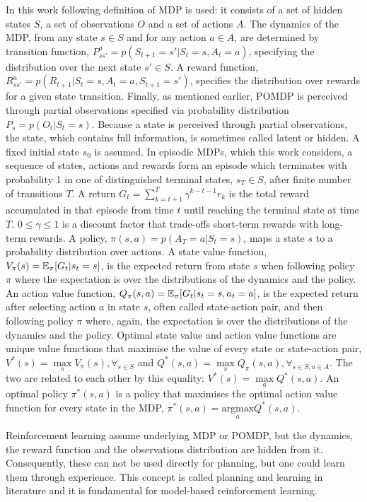 In this work following definition of MDP is used: it consists of a set of hidden states $S$, a set of observations $O$ and a set of actions $A$. The dynamics of the MDP, from any state $s \in S$ and for any action $a \in A$, are determined by transition function, $P^a_{ss'} = p(S_{t+1} = s' | S_t = s, A_t = a)$, specifying the distribution over the next state $s' \in S$. A reward function, $R^a_{ss'} = p(R_{t+1} | S_t = s, A_t = a, S_{t+1} = s')$, specifies the distribution over rewards for a given state transition. Finally, as mentioned earlier, POMDP is perceived through partial observations specified via probability distribution $P_s = p(O_t | S_t = s)$. Because a state is perceived through partial observations, the state, which contains full information, is sometimes called latent or hidden.
A fixed initial state $s_0$ is assumed. In episodic MDPs, which this work considers, a sequence of states, actions and rewards form an episode which terminates with probability 1 in one of distinguished terminal states, $s_T \in S$, after finite number of transitions $T$. A return $G_t = \sum^T_{k=t+1}\gamma^{k-t-1}r_k$ is the total reward accumulated in that episode from time $t$ until reaching the terminal state at time $T$. $0 \leqslant \gamma \leqslant 1$ is a discount factor that trade-offs short-term rewards with long-term rewards.
A policy, $\pi(s, a) = p(A_T = a | S_t = s)$, maps a state $s$ to a probability distribution over actions.
A state value function, $V_\pi(s) = \operatorname{\mathbb{E}}_\pi[G_t | s_t = s]$, is the expected return from state $s$ when following policy $\pi$ where the expectation is over the distributions of the dynamics and the policy.
An action value function, $Q_\pi(s, a) = \operatorname{\mathbb{E}}_\pi[G_t | s_t = s, a_t = a]$, is the expected return after selecting action $a$ in state $s$, often called state-action pair, and then following policy $\pi$ where, again, the expectation is over the distributions of the dynamics and the policy.
Optimal state value and action value functions are unique value functions that maximise the value of every state or state-action pair, $V^*(s) = \underset{\pi}{\max}V_\pi(s), \forall_{s \in S}$ and $Q^*(s, a) = \underset{\pi}{\max}Q_\pi(s, a), \forall_{s \in S, a \in A}$. The two are related to each other by this equality: $V^*(s) = \underset{a}{\max}Q^*(s, a)$.
An optimal policy $\pi^*(s, a)$ is a policy that maximises the optimal action value function for every state in the MDP, $\pi^*(s, a) = \underset{a}{\mathrm{argmax}}Q^*(s, a)$.

Reinforcement learning assume underlying MDP or POMDP, but the dynamics, the reward function and the observations distribution are hidden from it. Consequently, these can not be used directly for planning, but one could learn them through experience. This concept is called planning and learning in literature \cite{Book.RLAI} and it is fundamental for model-based reinforcement learning.

